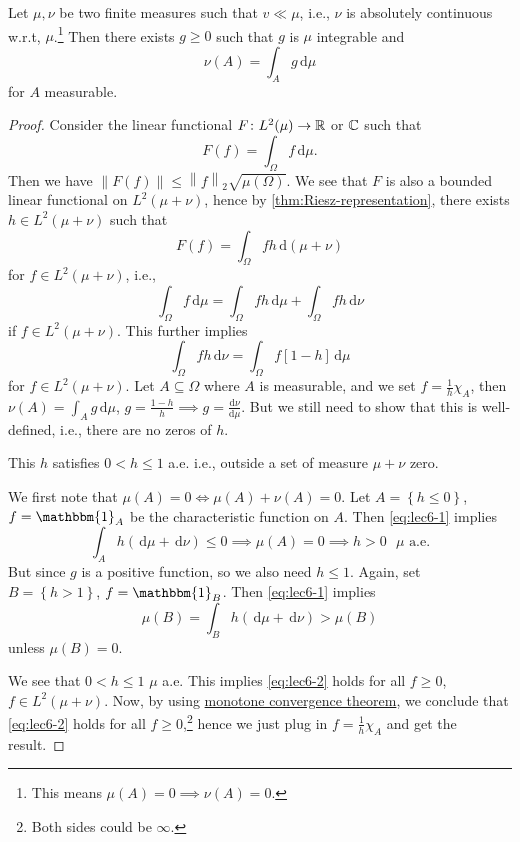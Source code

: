 \begin{theorem}\label{thm:Radon-Nikodym}
	Let \(\mu , \nu \) be two finite measures such that \(v \ll \mu \), i.e., \(\nu \) is absolutely continuous w.r.t, \(\mu \).\footnote{This means \(\mu (A) = 0 \implies \nu (A) = 0\).} Then there exists \(g \geq 0\) such that \(g\) is \(\mu \) integrable and
	\[
		\nu (A) = \int _A g \,\mathrm{d} \mu
	\]
	for \(A\) measurable.
\end{theorem}
\begin{proof}
	Consider the linear functional \(F\colon L^2(\mu ) \to \mathbb{\MakeUppercase{r}} \) or \(\mathbb{\MakeUppercase{c}} \) such that
	\[
		F(f) = \int _{\Omega }f\,\mathrm{d} \mu .
	\]
	Then we have \(\left\lVert F(f)\right\rVert \leq \left\lVert f\right\rVert _2 \sqrt{ \mu (\Omega )}\). We see that \(F\) is also a bounded linear functional on \(L^2(\mu + \nu )\), hence by \autoref{thm:Riesz-representation}, there exists \(h\in L^2(\mu +\nu )\) such that
	\[
		F(f) = \int_\Omega  fh\,\mathrm{d} (\mu +\nu )
	\]
	for \(f\in L^2(\mu + \nu )\), i.e.,
	\begin{equation}\label{eq:lec6-1}
		\int _\Omega f\,\mathrm{d} \mu = \int _\Omega fh\,\mathrm{d} \mu + \int _\Omega fh \,\mathrm{d} \nu
	\end{equation}
	if \(f\in L^2(\mu +\nu )\). This further implies
	\begin{equation}\label{eq:lec6-2}
		\int _\Omega fh\,\mathrm{d} \nu = \int _\Omega f[1 - h] \,\mathrm{d} \mu
	\end{equation}
	for \(f\in L^2(\mu + \nu )\). Let \(A\subseteq \Omega \) where \(A\) is measurable, and we set \(f = \frac{1}{h}\chi _A\), then \(\nu (A) = \int _A g\,\mathrm{d} \mu \), \(g = \frac{1 - h}{h}\implies g = \frac{\mathrm{d}\nu }{\mathrm{d}\mu }\). But we still need to show that this is well-defined, i.e., there are no zeros of \(h\).
	\begin{claim}
		This \(h\) satisfies \(0 < h \leq 1\) a.e. i.e., outside a set of measure \(\mu +\nu \) zero.
	\end{claim}
	\begin{explanation}
		We first note that \(\mu (A) = 0 \iff \mu (A) + \nu (A) = 0\). Let \(A = \left\{ h \leq 0 \right\} \), \(f = \mathbbm{1}_{A}\) be the characteristic function on \(A\). Then \autoref{eq:lec6-1} implies
		\[
			\int _A h ( \,\mathrm{d} \mu  + \,\mathrm{d} \nu ) \leq 0 \implies \mu (A) = 0 \implies h > 0 \text{ \(\mu\) a.e.}
		\]
		But since \(g\) is a positive function, so we also need \(h \leq 1\). Again, set \(B = \left\{ h > 1 \right\} \), \(f = \mathbbm{1}_{B}\). Then \autoref{eq:lec6-1} implies
		\[
			\mu (B) = \int _B h \left( \,\mathrm{d} \mu + \,\mathrm{d} \nu  \right) > \mu (B)
		\]
		unless \(\mu (B) = 0\).
	\end{explanation}
	We see that \(0 < h \leq 1\) \(\mu \) a.e. This implies \autoref{eq:lec6-2} holds for all \(f \geq 0\), \(f\in L^2(\mu + \nu )\). Now, by using \href{https://en.wikipedia.org/wiki/Monotone_convergence_theorem}{monotone convergence theorem}, we conclude that \autoref{eq:lec6-2} holds for all \(f \geq 0\),\footnote{Both sides could be \(\infty\).} hence we just plug in \(f = \frac{1}{h}\chi _A\) and get the result.
\end{proof}


